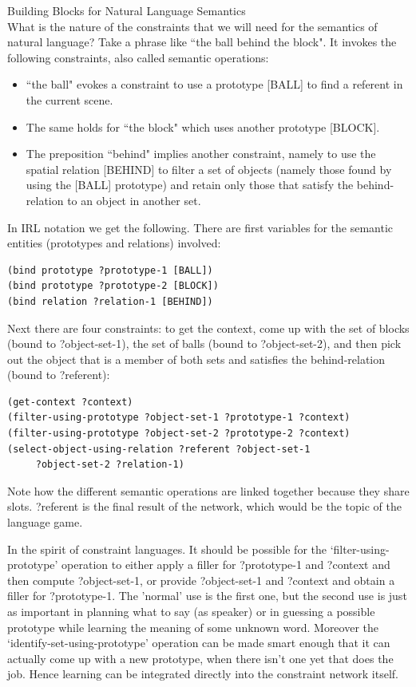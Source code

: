 {\bfshape Building Blocks for Natural Language Semantics }\\

What is the nature of the constraints that we will need for the semantics of natural language? 
Take a phrase like ``the ball behind the block". It invokes the following constraints, also called 
semantic operations: 
\begin{itemize}
\item ``the ball" evokes a constraint to use a prototype [BALL] to find a referent in the current scene.
\item The same holds for ``the block" which uses another prototype [BLOCK]. 
\item The preposition ``behind" implies another constraint, namely to use the spatial relation [BEHIND] to filter a 
set of objects (namely those found by using the [BALL] prototype) and retain only those that satisfy the behind-relation 
to an object in another set. 
\end{itemize} 

In IRL notation we get the following. There are first variables for the semantic entities (prototypes and relations) 
involved:
\begin{verbatim}
(bind prototype ?prototype-1 [BALL])
(bind prototype ?prototype-2 [BLOCK])
(bind relation ?relation-1 [BEHIND])
\end{verbatim}
Next there are four constraints: to get the context, come up with the set of blocks
(bound to ?object-set-1), the set of balls (bound to ?object-set-2), and then pick out the object 
that is a member of both sets and satisfies the behind-relation (bound to ?referent): 
\begin{verbatim}
(get-context ?context)
(filter-using-prototype ?object-set-1 ?prototype-1 ?context)
(filter-using-prototype ?object-set-2 ?prototype-2 ?context)
(select-object-using-relation ?referent ?object-set-1
     ?object-set-2 ?relation-1)
\end{verbatim}
Note how the different semantic operations are linked together because they share slots.
?referent is the final result of the network, which would be the topic of the language game. 

In the spirit of constraint languages. It should be possible for the `filter-using-prototype' operation
to either apply a filler for ?prototype-1 and 
?context and then compute ?object-set-1, or provide ?object-set-1 and ?context and obtain a filler for ?prototype-1. 
The 'normal' use is the first one, but the second use is just as important in planning what to
say (as speaker) or in guessing a possible prototype while learning the meaning of some unknown word. 
Moreover the `identify-set-using-prototype' operation can be made smart enough that it can actually come up with
a new prototype, when there isn't one yet that does the job. Hence learning can be 
integrated directly into the constraint network itself. 


